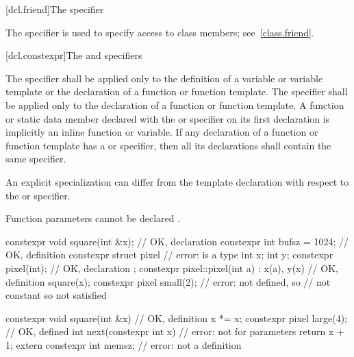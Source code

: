 [dcl.friend]{The  specifier}%

\pnum
The  specifier is used to specify access to class members;
see~\ref{class.friend}.

[dcl.constexpr]{The  and  specifiers}%

\pnum
The  specifier shall be applied only to
the definition of a variable or variable template or
the declaration of a function or function template.
The  specifier shall be applied only to
the declaration of a function or function template.
A function or static data member
declared with the  or  specifier
on its first declaration
is implicitly an inline function or variable.
If any declaration of a function or function template has
a  or  specifier,
then all its declarations shall contain the same specifier.
\begin{note}
An explicit specialization can differ from the template declaration
with respect to the  or  specifier.
\end{note}
\begin{note}
Function parameters cannot be declared .
\end{note}
\begin{example}
\begin{codeblock}
constexpr void square(int &x);  // OK, declaration
constexpr int bufsz = 1024;     // OK, definition
constexpr struct pixel {        // error:  is a type
  int x;
  int y;
  constexpr pixel(int);         // OK, declaration
};
constexpr pixel::pixel(int a)
  : x(a), y(x)                  // OK, definition
  { square(x); }
constexpr pixel small(2);       // error:  not defined, so 
                                // not constant so  not satisfied

constexpr void square(int &x) { // OK, definition
  x *= x;
}
constexpr pixel large(4);       // OK,  defined
int next(constexpr int x) {     // error: not for parameters
     return x + 1;
}
extern constexpr int memsz;     // error: not a definition
\end{codeblock}
\end{example}

